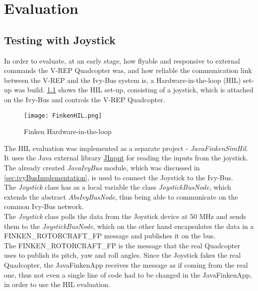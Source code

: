 \chapter{Evaluation}
\label{chap:eval}
\section{Testing with Joystick}
\label{sec:evalJoystick}

In order to evaluate, at an early stage, how flyable and responsive to external commands the V-REP Quadcopter was, and how reliable the communication link between the V-REP and the Ivy-Bus system is, a Hardware-in-the-loop (HIL) set-up was build. 
\ref{fig:finkenHIL} shows the HIL set-up, consisting of a joystick, which is attached on the Ivy-Bus and controls the V-REP Quadcopter.


\begin{figure}[h!]
 \begin{center}
  \texttt{[image: FinkenHIL.png]}
 \end{center}
  \caption{Finken Hardware-in-the-loop\label{fig:finkenHIL}}
\end{figure}

The HIL evaluation was implemented as a separate project - \textit{JavaFinkenSimHil}. 
It uses the Java external library \href{https://java.net/projects/jinput}{JInput} for reading the inputs from the joystick. 
The already created \textit{JavaIvyBus} module, which was discussed in \ref{sec:ivyBusImplementation}, is used to connect the Joystick to the Ivy-Bus. \\

The \textit{Joystick} class has as a local variable the class \textit{JoystickBusNode}, which extends the abstract \textit{AbsIvyBusNode}, thus being able to communicate on the common Ivy-Bus network. \\

The \textit{Joystick} class polls the data from the Joystick device at 50 MHz and sends them to the \textit{JoystickBusNode}, which on the other hand encapsulates the data in a FINKEN\_ROTORCRAFT\_FP message and publishes it on the bus. \\ 

The FINKEN\_ROTORCRAFT\_FP is the message that the real Quadcopter uses to publish its pitch, yaw and roll angles. 
Since the Joystick fakes the real Quadcopter, the JavaFinkenApp receives the message as if coming from the real one, thus not even a single line of code had to be changed in the JavaFinkenApp, in order to use the HIL evaluation. \\

